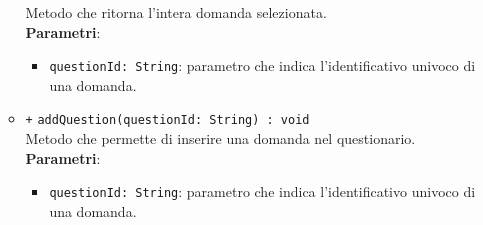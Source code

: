 \begin{itemize}
\begin{itemize}
		Metodo che ritorna l'intera domanda selezionata.\\
		\textbf{Parametri}:
		\begin{itemize}
			\item \texttt{questionId: String}: parametro che indica l'identificativo univoco di una domanda.
		\end{itemize}
		\item \texttt{+} \texttt{addQuestion(questionId: String) : void} \\
		Metodo che permette di inserire una domanda nel questionario.\\
		\textbf{Parametri}:
		\begin{itemize}
			\item \texttt{questionId: String}: parametro che indica l'identificativo univoco di una domanda.
		\end{itemize}
	\end{itemize}
\end{itemize}

